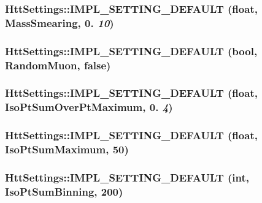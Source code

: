 \label{classHttSettings_ab8d151b450153fb32b2a421d7ee0ca41}
\hypertarget{classHttSettings_a247aca9246c0e51385df39069a06961e}{
\subsubsection[{IMPL\_\-SETTING\_\-DEFAULT}]{\setlength{\rightskip}{0pt plus 5cm}HttSettings::IMPL\_\-SETTING\_\-DEFAULT (float, \/  MassSmearing, \/  0. {\em 10})}}
\label{classHttSettings_a247aca9246c0e51385df39069a06961e}
\hypertarget{classHttSettings_a82e40b06ba0457e907594caae1c6673e}{
\subsubsection[{IMPL\_\-SETTING\_\-DEFAULT}]{\setlength{\rightskip}{0pt plus 5cm}HttSettings::IMPL\_\-SETTING\_\-DEFAULT (bool, \/  RandomMuon, \/  false)}}
\label{classHttSettings_a82e40b06ba0457e907594caae1c6673e}
\hypertarget{classHttSettings_a0862d6ec9c0f52fd03a4886b4fee068e}{
\subsubsection[{IMPL\_\-SETTING\_\-DEFAULT}]{\setlength{\rightskip}{0pt plus 5cm}HttSettings::IMPL\_\-SETTING\_\-DEFAULT (float, \/  IsoPtSumOverPtMaximum, \/  0. {\em 4})}}
\label{classHttSettings_a0862d6ec9c0f52fd03a4886b4fee068e}
\hypertarget{classHttSettings_ae90250f13cf5baa41e67dfb9847d85c4}{
\subsubsection[{IMPL\_\-SETTING\_\-DEFAULT}]{\setlength{\rightskip}{0pt plus 5cm}HttSettings::IMPL\_\-SETTING\_\-DEFAULT (float, \/  IsoPtSumMaximum, \/  50)}}
\label{classHttSettings_ae90250f13cf5baa41e67dfb9847d85c4}
\hypertarget{classHttSettings_a985e2cd59bd900213f04ee61aa532d85}{
\subsubsection[{IMPL\_\-SETTING\_\-DEFAULT}]{\setlength{\rightskip}{0pt plus 5cm}HttSettings::IMPL\_\-SETTING\_\-DEFAULT (int, \/  IsoPtSumBinning, \/  200)}}
